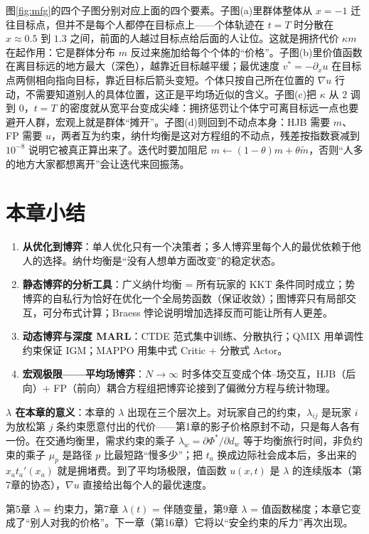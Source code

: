 图\ref{fig:mfg}的四个子图分别对应上面的四个要素。子图(a)里群体整体从 $x=-1$ 迁往目标点，但并不是每个人都停在目标点上——个体轨迹在 $t=T$ 时分散在 $x\approx0.5$ 到 $1.3$ 之间，前面的人越过目标点给后面的人让位。这就是拥挤代价 $\kappa m$ 在起作用：它是群体分布 $m$ 反过来施加给每个个体的``价格''。子图(b)里价值函数在离目标远的地方最大（深色），越靠近目标越平缓；最优速度 $v^*=-\partial_x u$ 在目标点两侧相向指向目标，靠近目标后箭头变短。个体只按自己所在位置的 $\nabla u$ 行动，不需要知道别人的具体位置，这正是平均场近似的含义。子图(c)把 $\kappa$ 从 $2$ 调到 $0$，$t=T$ 的密度就从宽平台变成尖峰：拥挤惩罚让个体宁可离目标远一点也要避开人群，宏观上就是群体``摊开''。子图(d)则回到不动点本身：HJB 需要 $m$、FP 需要 $u$，两者互为约束，纳什均衡是这对方程组的不动点，残差按指数衰减到 $10^{-8}$ 说明它被真正算出来了。迭代时要加阻尼 $m\leftarrow(1-\theta)m+\theta\tilde m$，否则``人多的地方大家都想离开''会让迭代来回振荡。

\section{本章小结}

\begin{enumerate}
    \item \textbf{从优化到博弈}：单人优化只有一个决策者；多人博弈里每个人的最优依赖于他人的选择。纳什均衡是“没有人想单方面改变”的稳定状态。
    \item \textbf{静态博弈的分析工具}：广义纳什均衡 = 所有玩家的 KKT 条件同时成立；势博弈的自私行为恰好在优化一个全局势函数（保证收敛）；图博弈只有局部交互，可分布式计算；Braess 悖论说明增加选择反而可能让所有人更差。
    \item \textbf{动态博弈与深度 MARL}：CTDE 范式集中训练、分散执行；QMIX 用单调性约束保证 IGM；MAPPO 用集中式 Critic + 分散式 Actor。
    \item \textbf{宏观极限——平均场博弈}：$N \to \infty$ 时多体交互变成个体--场交互，HJB（后向）+ FP（前向）耦合方程组把博弈论接到了偏微分方程与统计物理。
\end{enumerate}

\begin{physicalmeaning}
\textbf{$\lambda$ 在本章的意义}：本章的 $\lambda$ 出现在三个层次上。对玩家自己的约束，$\lambda_{ij}$ 是玩家 $i$ 为放松第 $j$ 条约束愿意付出的代价——第1章的影子价格原封不动，只是每人各有一份。在交通均衡里，需求约束的乘子 $\lambda_w = \partial \Phi^*/\partial d_w$ 等于均衡旅行时间，非负约束的乘子 $\mu_p$ 是路径 $p$ 比最短路“慢多少”；把 $t_a$ 换成边际社会成本后，多出来的 $x_a t_a'(x_a)$ 就是拥堵费。到了平均场极限，值函数 $u(x, t)$ 是 $\lambda$ 的连续版本（第7章的协态），$\nabla u$ 直接给出每个人的最优速度。

第5章 $\lambda$ = 约束力，第7章 $\lambda(t)$ = 伴随变量，第9章 $\lambda$ = 值函数梯度；本章它变成了“别人对我的价格”。下一章（第16章）它将以“安全约束的斥力”再次出现。
\end{physicalmeaning}

